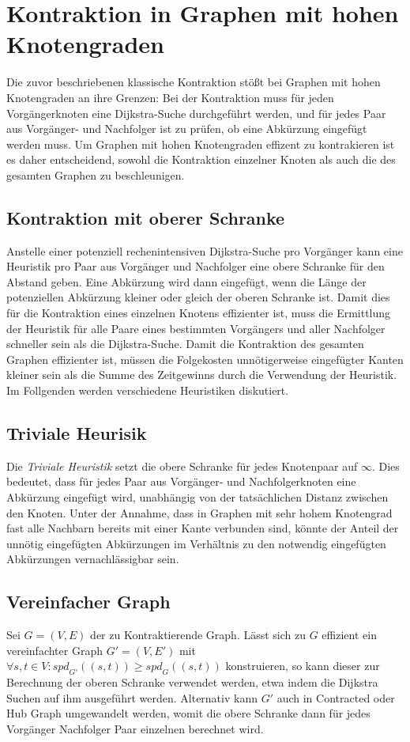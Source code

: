 \chapter{Kontraktion in Graphen mit hohen Knotengraden}

Die zuvor beschriebenen klassische Kontraktion stößt bei Graphen mit hohen Knotengraden an ihre Grenzen:
Bei der Kontraktion muss für jeden Vorgängerknoten eine Dijkstra-Suche durchgeführt werden, und für jedes Paar aus Vorgänger- und Nachfolger ist zu prüfen, ob eine Abkürzung eingefügt werden muss.
Um Graphen mit hohen Knotengraden effizent zu kontrakieren ist es daher entscheidend, sowohl die Kontraktion einzelner Knoten als auch die des gesamten Graphen zu beschleunigen.

\section{Kontraktion mit oberer Schranke}
Anstelle einer potenziell rechenintensiven Dijkstra-Suche pro Vorgänger kann eine Heuristik pro Paar aus Vorgänger und Nachfolger eine obere Schranke für den Abstand geben.
Eine Abkürzung wird dann eingefügt, wenn die Länge der potenziellen Abkürzung kleiner oder gleich der oberen Schranke ist.
Damit dies für die Kontraktion eines einzelnen Knotens effizienter ist, muss die Ermittlung der Heuristik für alle Paare eines bestimmten Vorgängers und aller Nachfolger schneller sein als die Dijkstra-Suche.
Damit die Kontraktion des gesamten Graphen effizienter ist, müssen die Folgekosten unnötigerweise eingefügter Kanten kleiner sein als die Summe des Zeitgewinns durch die Verwendung der Heuristik.
Im Follgenden werden verschiedene Heuristiken diskutiert.

\section{Triviale Heurisik}
Die \emph{Triviale Heuristik} setzt die obere Schranke für jedes Knotenpaar auf $\infty$.
Dies bedeutet, dass für jedes Paar aus Vorgänger- und Nachfolgerknoten eine Abkürzung eingefügt wird, unabhängig von der tatsächlichen Distanz zwischen den Knoten.
Unter der Annahme, dass in Graphen mit sehr hohem Knotengrad fast alle Nachbarn bereits mit einer Kante verbunden sind, könnte der Anteil der unnötig eingefügten Abkürzungen im Verhältnis zu den notwendig eingefügten Abkürzungen vernachlässigbar sein.

\section{Vereinfacher Graph}
Sei $G = (V, E)$ der zu Kontraktierende Graph.
Lässt sich zu $G$ effizient ein vereinfachter Graph $G' = (V, E')$ mit $\forall s, t \in V \colon {spd}_{G'} ((s, t)) \geq {spd}_{G} ((s, t))$ konstruieren, so kann dieser zur Berechnung der oberen Schranke verwendet werden, etwa indem die Dijkstra Suchen auf ihm ausgeführt werden.
Alternativ kann $G'$ auch in Contracted oder Hub Graph umgewandelt werden, womit die obere Schranke dann für jedes Vorgänger Nachfolger Paar einzelnen berechnet wird.

